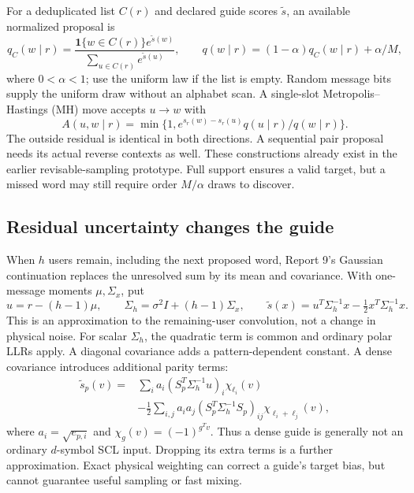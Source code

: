 \documentclass[10pt,a4paper]{article}
\newcommand{\ind}{\mathbf 1}
\begin{document}
For a deduplicated list $C(r)$ and declared guide scores $\widetilde s$, an available normalized proposal is
\begin{equation}
 q_C(w\mid r)=\frac{\ind\{w\in C(r)\}e^{\widetilde s(w)}}
                    {\sum_{u\in C(r)}e^{\widetilde s(u)}},\qquad
 q(w\mid r)=(1-\alpha)q_C(w\mid r)+\alpha/M,
 \label{eq:listproposal}
\end{equation}
where $0<\alpha<1$; use the uniform law if the list is empty. Random message bits supply the uniform
draw without an alphabet scan. A single-slot Metropolis--Hastings (MH) move accepts $u\to w$ with
\begin{equation}
 A(u,w\mid r)=\min\{1,e^{s_r(w)-s_r(u)}q(u\mid r)/q(w\mid r)\}.
 \label{eq:mh}
\end{equation}
The outside residual is identical in both directions. A sequential pair proposal needs its actual
reverse contexts as well. These constructions already exist in the earlier revisable-sampling prototype.
Full support ensures a valid target, but a missed word may still require order $M/\alpha$ draws to discover.

\subsection{Residual uncertainty changes the guide}
When $h$ users remain, including the next proposed word, Report 9's Gaussian continuation replaces the
unresolved sum by its mean and covariance. With one-message moments $\mu,\Sigma_x$, put
\[
 u=r-(h-1)\mu,\qquad \Sigma_h=\sigma^2I+(h-1)\Sigma_x,
 \qquad \widetilde s(x)=u^T\Sigma_h^{-1}x-\tfrac12x^T\Sigma_h^{-1}x.
\]
This is an approximation to the remaining-user convolution, not a change in physical noise.
For scalar $\Sigma_h$, the quadratic term is common and ordinary polar LLRs apply. A diagonal
covariance adds a pattern-dependent constant. A dense covariance introduces additional parity terms:
\begin{align}
 \widetilde s_p(v)={}&\sum_i a_i(S_p^T\Sigma_h^{-1}u)_i\chi_{\ell_i}(v)\nonumber\\
 &-\tfrac12\sum_{i,j}a_ia_j(S_p^T\Sigma_h^{-1}S_p)_{ij}\chi_{\ell_i+\ell_j}(v),
 \label{eq:quadraticcharacters}
\end{align}
where $a_i=\sqrt{e_{p,i}}$ and $\chi_g(v)=(-1)^{g^Tv}$. Thus a dense guide is generally not an ordinary
$d$-symbol SCL input. Dropping its extra terms is a further approximation. Exact physical weighting
can correct a guide's target bias, but cannot guarantee useful sampling or fast mixing.
\end{document}
